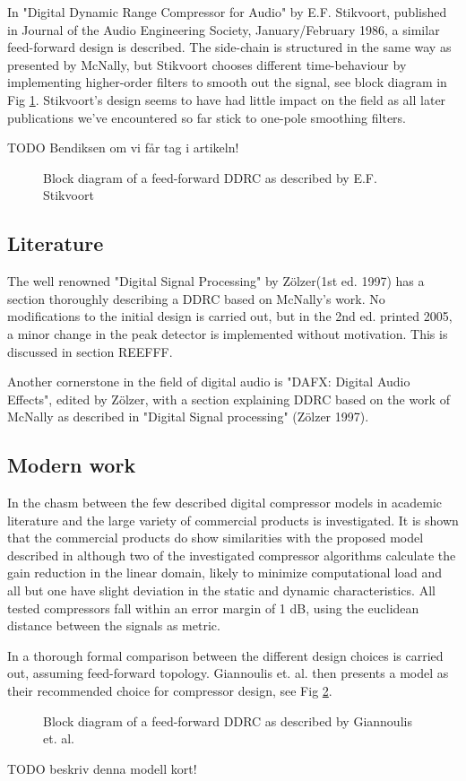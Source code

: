 \documentclass[]{article}
\begin{document}
In "Digital Dynamic Range Compressor for Audio" by E.F. Stikvoort, published in  Journal of the Audio Engineering Society, January/February 1986, a similar feed-forward design is described. The side-chain is structured in the same way as presented by McNally, but Stikvoort chooses different time-behaviour by implementing higher-order filters to smooth out the signal, see block diagram in Fig \ref{fig:stikvoortBlock}. Stikvoort's design seems to have had little impact on the field as all later publications we've encountered so far stick to one-pole smoothing filters.

TODO Bendiksen om vi får tag i artikeln!

\begin{figure}
\caption{Block diagram of a feed-forward DDRC as described by E.F. Stikvoort}
\label{fig:stikvoortBlock}
\end{figure}

\subsection*{Literature}
The well renowned "Digital Signal Processing" by Zölzer(1st ed. 1997) has a section thoroughly describing a DDRC based on McNally's work. No modifications to the initial design is carried out, but in the 2nd ed. printed 2005, a minor change in the peak detector is implemented without motivation. This is discussed in section REEFFF.

Another cornerstone in the field of digital audio is "DAFX: Digital Audio Effects", edited by Zölzer, with a section explaining DDRC based on the work of McNally as described in "Digital Signal processing" (Zölzer 1997).

\subsection*{Modern work}
In \cite{bitzer2006parameter} the chasm between the few described digital compressor models in academic literature and the large variety of commercial products is investigated. It is shown that the commercial products do show similarities with the proposed model described in \cite{mcnally1984dynamic}\cite{zolzer1997digital}\cite{dafx} although two of the investigated compressor algorithms calculate the gain reduction in the linear domain, likely to minimize computational load\cite{bitzer2006parameter} and all but one have slight deviation in the static and dynamic characteristics. All tested compressors fall within an error margin of 1 dB, using the euclidean distance between the signals as metric.

In \cite{giannoullis} a thorough formal comparison between the different design choices is carried out, assuming feed-forward topology. Giannoulis et. al.  then presents a model as their recommended choice for compressor design, see Fig \ref{fig:gian_ddrc_block}.
\begin{figure}
\caption{Block diagram of a feed-forward DDRC as described by Giannoulis et. al.}
\label{fig:gian_ddrc_block}
\end{figure}

TODO beskriv denna modell kort!


\end{document}
